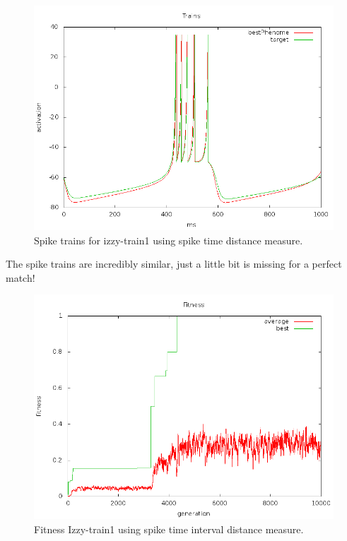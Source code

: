 \documentclass[a4paper]{article}
\begin{document}
\begin{figure}[htb!]
  \centering
  \includegraphics[width=\textwidth]{SpikeTime-izzy1-trains-plot.png}
  \caption{Spike trains for izzy-train1 using spike time distance measure.}
\end{figure}

The spike trains are incredibly similar, just a little bit is missing for a perfect match!

\newpage

\begin{figure}[htb!]
  \centering
  \includegraphics[width=\textwidth]{SpikeInterval-izzy1-fitness-plot.png}
  \caption{Fitness Izzy-train1 using spike time interval distance measure.}
\end{figure}
\end{document}
